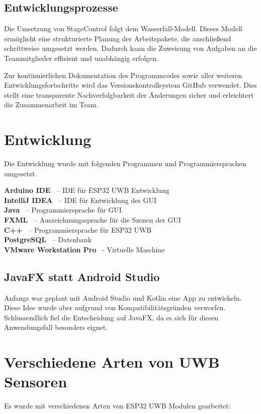 \subsection{Entwicklungsprozesse}  
Die Umsetzung von StageControl folgt dem Wasserfall-Modell. Dieses Modell ermöglicht eine strukturierte Planung der Arbeitspakete, die anschließend schrittweise umgesetzt werden. Dadurch kann die Zuweisung von Aufgaben an die Teammitglieder effizient und unabhängig erfolgen.  

Zur kontinuierlichen Dokumentation des Programmcodes sowie aller weiteren Entwicklungsfortschritte wird das Versionskontrollsystem GitHub verwendet. Dies stellt eine transparente Nachverfolgbarkeit der Änderungen sicher und erleichtert die Zusammenarbeit im Team.

\section{Entwicklung}
Die Entwicklung wurde mit folgenden Programmen und Programmiersprachen umgesetzt.

\textbf{Arduino IDE} \ – IDE für ESP32 UWB Entwicklung \\
\textbf{IntelliJ IDEA} \ – IDE für Entwicklung des GUI \\
\textbf{Java} \ – Programmiersprache für GUI \\
\textbf{FXML} \ – Auszeichnungssprache für die Szenen der GUI \\
\textbf{C++} \ – Programmiersprache für ESP32 UWB \\
\textbf{PostgreSQL} \ – Datenbank \\
\textbf{VMware Workstation Pro} \ - Virtuelle Maschine

\subsection{JavaFX statt Android Studio}
Anfangs war geplant mit Android Studio und Kotlin eine App zu entwickeln. Diese Idee wurde aber aufgrund von Kompatibilitätsgründen verworfen. Schlussendlich fiel die Entscheidung auf JavaFX, da es sich für diesen Anwendungsfall besonders eignet. 

\section{Verschiedene Arten von UWB Sensoren}

Es wurde mit verschiedenen Arten von ESP32 UWB Modulen gearbeitet: 

